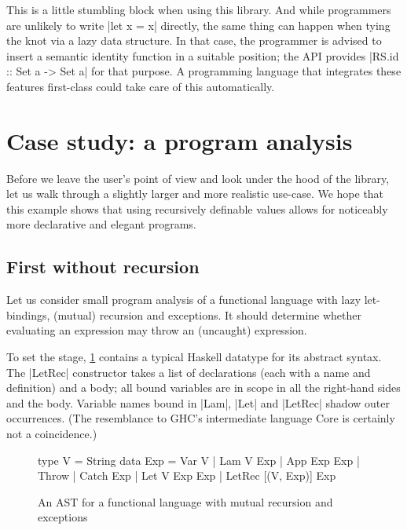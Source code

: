 \documentclass[manuscript,review,screen,acmsmall]{acmart}
\begin{document}
This is a little stumbling block when using this library. And while programmers are unlikely to write |let x = x| directly, the same thing can happen when tying the knot via a lazy data structure. In that case, the programmer is advised to insert a semantic identity function in a suitable position; the API provides |RS.id :: Set a -> Set a| for that purpose.
A programming language that integrates these features first-class could take care of this automatically.

\section{Case study: a program analysis}\label{sec:casestudy}

Before we leave the user's point of view and look under the hood of the library, let us walk through a slightly larger and more realistic use-case. We hope that this example shows that using recursively definable values allows for noticeably more declarative and elegant programs.

\subsection{First without recursion}

Let us consider small program analysis of a functional language with lazy let-bindings, (mutual) recursion and exceptions. It should determine whether evaluating an expression may throw an (uncaught) expression.

To set the stage, \cref{fig:analast} contains a typical Haskell datatype for its abstract syntax. The |LetRec| constructor takes a list of declarations (each with a name and definition) and a body; all bound variables are in scope in all the right-hand sides and the body.
Variable names bound in |Lam|, |Let| and |LetRec| shadow outer occurrences. (The resemblance to GHC's intermediate language Core \citep{secrets} is certainly not a coincidence.)

\begin{figure}
\setlength{\abovedisplayskip}{0pt}%
\setlength{\belowdisplayskip}{0pt}%
\begin{code}
type V    =  String
data Exp  =  Var V | Lam V Exp | App Exp Exp | Throw | Catch Exp
          |  Let V Exp Exp | LetRec [(V, Exp)] Exp
\end{code}
\caption{An AST for a functional language with mutual recursion and exceptions}
\label{fig:analast}
\end{figure}
\end{document}
